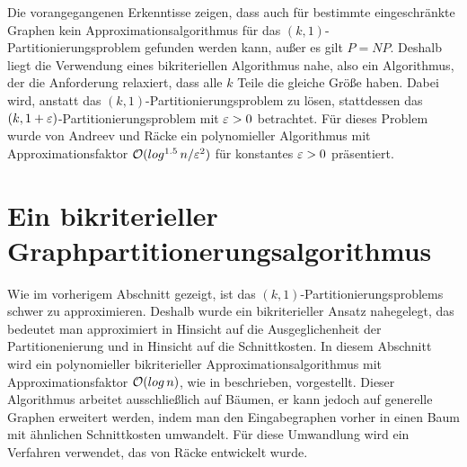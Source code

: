 Die vorangegangenen Erkenntisse zeigen, dass auch für bestimmte eingeschränkte Graphen kein Approximationsalgorithmus für das $(k,1)$-Partitionierungsproblem gefunden werden kann, außer es gilt $P=NP$. 
Deshalb liegt die Verwendung eines bikriteriellen Algorithmus nahe, also ein Algorithmus, der die Anforderung relaxiert, dass alle $k$ Teile die gleiche Größe haben.
Dabei wird, anstatt das $(k,1)$-Partitionierungsproblem zu lösen, stattdessen das $(k,1+\varepsilon)$-Partitionierungsproblem mit $\varepsilon > 0$ betrachtet.
Für dieses Problem wurde von Andreev und Räcke ein polynomieller Algorithmus mit Approximationsfaktor $\mathcal{O}(log^{1.5}\, n / \varepsilon^2)$ für konstantes $\varepsilon > 0$ präsentiert. \parencite{ar06} 

\section{Ein bikriterieller Graphpartitionerungsalgorithmus}
Wie im vorherigem Abschnitt gezeigt, ist das $(k,1)$-Partitionierungsproblems schwer zu approximieren. 
Deshalb wurde ein bikriterieller Ansatz nahegelegt, das bedeutet man approximiert in Hinsicht auf die Ausgeglichenheit der Partitionenierung und in Hinsicht auf die Schnittkosten.
In diesem Abschnitt wird ein polynomieller bikriterieller Approximationsalgorithmus mit Approximationsfaktor $\mathcal{O}(log\, n)$, wie in \parencite{ff13} beschrieben, vorgestellt.
Dieser Algorithmus arbeitet ausschließlich auf Bäumen, er kann jedoch auf generelle Graphen erweitert werden, indem man den Eingabegraphen vorher in einen Baum mit ähnlichen Schnittkosten umwandelt.
Für diese Umwandlung wird ein Verfahren verwendet, das von Räcke entwickelt wurde. \parencite{rc08}

